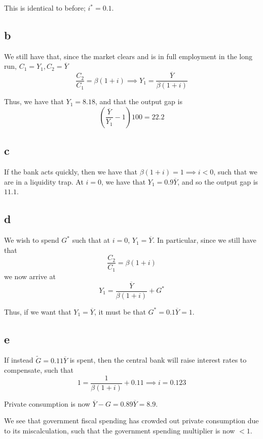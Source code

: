 \documentclass[12pt,letterpaper]{article}
\theoremstyle{definition}
\begin{document}
This is identical to before; $i^* = 0.1$.

\subsection*{b}

We still have that, since the market clears and is in full employment in the
long run, $C_1 = Y_1, C_2 = \overline{Y}$
\[
  \frac{C_2}{C_1} = \beta(1 + i) \implies Y_1 = \frac{\overline{Y}}{\beta(1 + i)}
\]

Thus, we have that $Y_1 = 8.18$, and that the output gap is
\[
  \left(  \frac{\overline{Y}}{Y_1} - 1\right)100 = 22.2
\]

\subsection*{c}

If the bank acts quickly, then we have that $\beta(1 + i) = 1 \implies i < 0$,
such that we are in a liquidity trap. At $i = 0$, we have that $Y_1 =
0.9\overline{Y}$, and so the output gap is $11.1$.

\subsection*{d}

We wish to spend $G^*$ such that at $i = 0$, $Y_1 = \overline{Y}$. In particular,
since we still have that
\[
  \frac{C_2}{C_1} = \beta(1 + i)
\]
we now arrive at
\[
  Y_1 = \frac{\overline{Y}}{\beta(1 + i)} + G^*
\]

Thus, if we want that $Y_1 = \overline{Y}$, it must be that $G^* = 0.1\overline{Y}
= 1$.

\subsection*{e}

If instead $\tilde{G} = 0.11\overline{Y}$ is spent, then the central bank will raise interest
rates to compensate, such that
\[
  1 = \frac{1}{\beta(1 + i)} + 0.11 \implies i = 0.123
\]

Private consumption is now $\overline{Y} - G = 0.89\overline{Y} = 8.9$.

We see that government fiscal spending has crowded out private consumption due
to its miscalculation, such that the government spending multiplier is now $< 1$.
\end{document}
